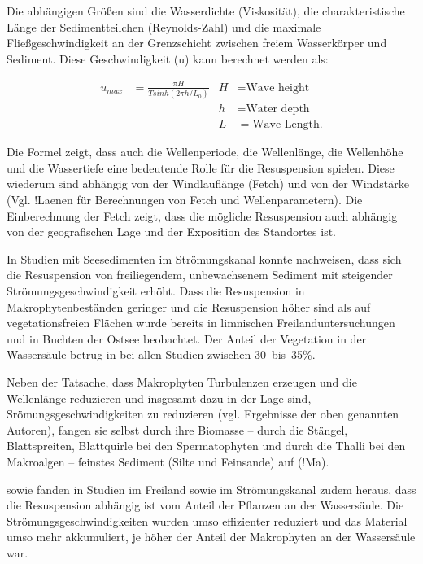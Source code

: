 Die abhängigen Größen sind die Wasserdichte (Viskosität), die charakteristische Länge der Sedimentteilchen (Reynolds-Zahl) und die maximale Fließgeschwindigkeit an der Grenzschicht zwischen freiem Wasserkörper und Sediment. Diese Geschwindigkeit (u) kann berechnet werden als:

\begin{align*}
u_{max} &= \frac{\pi H}{T sinh (2 \pi h / L_{0})} & H &=\text{Wave height}\\ 
        &     				                     & h &= \text{Water depth}\\
        &										 & L &= \text{Wave Length}.
\end{align*}


Die Formel zeigt, dass auch die Wellenperiode, die Wellenlänge, die Wellenhöhe und die Wassertiefe eine bedeutende Rolle für die Resuspension spielen. Diese wiederum sind abhängig von der Windlauflänge (Fetch) und von der Windstärke (Vgl. !Laenen für Berechnungen von Fetch und Wellenparametern). Die Einberechnung der Fetch zeigt, dass die mögliche Resuspension auch abhängig von der geografischen Lage und der Exposition des Standortes ist. 

In Studien mit Seesedimenten im Strömungskanal konnte \cite{hu_2011} nachweisen, dass sich die Resuspension von freiliegendem, unbewachsenem Sediment mit steigender Strömungsgeschwindigkeit erhöht. 
Dass die Resuspension in Makrophytenbeständen geringer und die Resuspension höher sind als auf vegetationsfreien Flächen wurde bereits in limnischen Freilanduntersuchungen \citep{horppila_2003, horppila_2005} und in Buchten der Ostsee \citep{kaitaranta_2013} beobachtet. Der Anteil der Vegetation in der Wassersäule betrug in bei allen Studien zwischen \unit{30 bis 35}{\%}.

Neben der Tatsache, dass Makrophyten Turbulenzen erzeugen und die Wellenlänge reduzieren und insgesamt dazu in der Lage sind, Srömungsgeschwindigkeiten zu reduzieren (vgl. Ergebnisse der oben genannten Autoren), fangen sie selbst durch ihre Biomasse – durch die Stängel, Blattspreiten, Blattquirle bei den Spermatophyten und durch die Thalli bei den Makroalgen – feinstes Sediment (Silte und Feinsande) auf (!Ma). 

\cite{ward_1984} sowie \cite{fonseca_1986} fanden in Studien im Freiland sowie im Strömungskanal zudem heraus, dass die Resuspension abhängig ist vom Anteil der Pflanzen an der Wassersäule. Die Strömungsgeschwindigkeiten wurden umso effizienter reduziert und das Material umso mehr akkumuliert, je höher der Anteil der Makrophyten an der Wassersäule war. 

